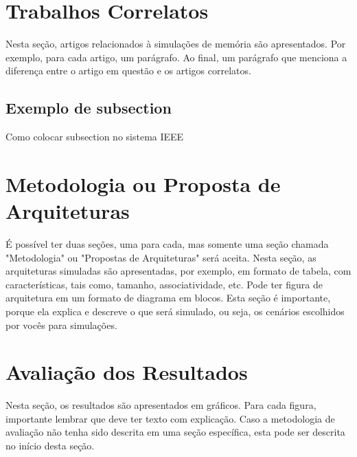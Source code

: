 \documentclass[conference]{IEEEtran}
\begin{document}
\section{Trabalhos Correlatos}

Nesta seção, artigos relacionados à simulações de memória são apresentados.
Por exemplo, para cada artigo, um parágrafo. Ao final, um parágrafo que menciona
a diferença entre o artigo em questão e os artigos correlatos.

\subsection{Exemplo de subsection}

Como colocar subsection no sistema IEEE

\section{Metodologia ou Proposta de Arquiteturas}

É possível ter duas seções, uma para cada, mas somente uma seção chamada 
"Metodologia" ou "Propostas de Arquiteturas" será aceita. Nesta seção, as 
arquiteturas simuladas são apresentadas, por exemplo, em formato de tabela, 
com características, tais como, tamanho, associatividade, etc.  Pode ter figura
de arquitetura em um formato de diagrama em blocos. Esta seção é importante, 
porque ela explica e descreve o que será simulado, ou seja, os cenários escolhidos 
por vocês para simulações.

\section{Avaliação dos Resultados}

Nesta seção, os resultados são apresentados em gráficos. Para cada figura,
importante lembrar que deve ter texto com explicação.
Caso a metodologia de avaliação não tenha sido descrita em uma seção específica,
esta pode ser descrita no início desta seção.
\end{document}
